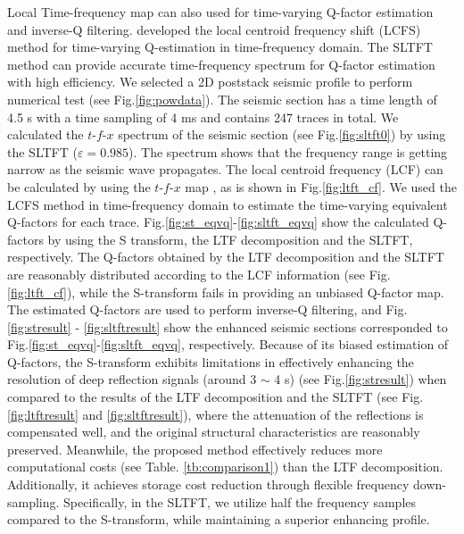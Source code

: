 Local Time-frequency map can also used for time-varying Q-factor
estimation and inverse-Q filtering. \cite{wang2020} developed the
local centroid frequency shift (LCFS) method for time-varying
Q-estimation in time-frequency domain. The SLTFT method can provide
accurate time-frequency spectrum for Q-factor estimation with high
efficiency. We selected a 2D poststack seismic profile to perform
numerical test (see Fig.\ref{fig:powdata}). The seismic
section has a time length of 4.5 s with a time sampling of 4 ms and
contains 247 traces in total. We calculated the
$t\textrm{-}f\textrm{-}x$ spectrum of the seismic section (see
Fig.\ref{fig:sltft0}) by using the SLTFT
($\varepsilon=0.985$). The spectrum shows that the frequency range is
getting narrow as the seismic wave propagates. The local centroid
frequency (LCF) can be calculated by using the
$t\textrm{-}f\textrm{-}x$ map \cite[]{Liu13,wang2020}, as is shown in
Fig.\ref{fig:ltft_cf}.  We used the LCFS method in
time-frequency domain to estimate the time-varying equivalent
Q-factors for each
trace. Fig.\ref{fig:st_eqvq}-\ref{fig:sltft_eqvq}
show the calculated Q-factors by using the S transform, the LTF
decomposition and the SLTFT, respectively. The Q-factors obtained by
the LTF decomposition and the SLTFT are reasonably distributed
according to the LCF information (see Fig.\ref{fig:ltft_cf}),
while the S-transform fails in providing an unbiased Q-factor map. The
estimated Q-factors are used to perform inverse-Q filtering, and
Fig.\ref{fig:stresult} - \ref{fig:sltftresult} show
the enhanced seismic sections corresponded to
Fig.\ref{fig:st_eqvq}-\ref{fig:sltft_eqvq},
respectively. Because of its biased estimation of Q-factors, the
S-transform exhibits limitations in effectively enhancing the
resolution of deep reflection signals (around 3 $\sim$ 4 s) (see
Fig.\ref{fig:stresult}) when compared to the results of the
LTF decomposition and the SLTFT (see Fig.\ref{fig:ltftresult}
and \ref{fig:sltftresult}), where the attenuation of the
reflections is compensated well, and the original structural
characteristics are reasonably preserved. Meanwhile, the proposed
method effectively reduces more computational costs (see
Table. \ref{tb:comparison1}) than the LTF decomposition. Additionally,
it achieves storage cost reduction through flexible frequency
down-sampling. Specifically, in the SLTFT, we utilize half the
frequency samples compared to the S-transform, while maintaining a
superior enhancing profile.


